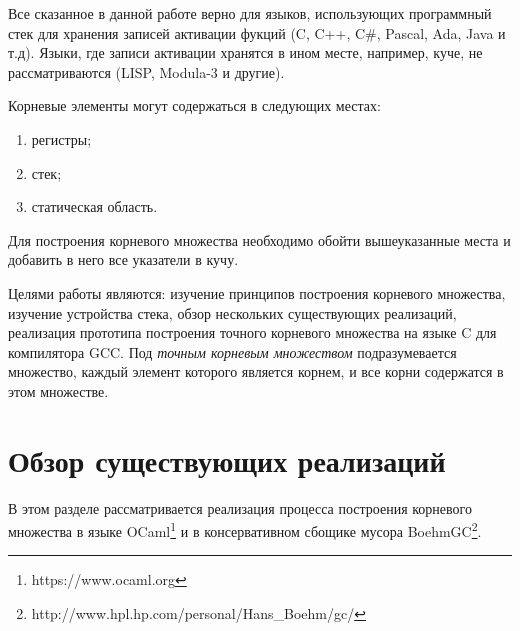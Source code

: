 \documentclass{matmex-diploma}
\begin{document}
Все сказанное в данной работе верно для языков, использующих программный стек для хранения записей активации фукций (C, C++, C\#, Pascal, Ada, Java и т.д). Языки, где записи активации хранятся в ином месте, например, куче, не рассматриваются (LISP, Modula-3 и другие).

Корневые элементы могут содержаться в следующих местах:
\begin{enumerate}
\item регистры;
\item стек;
\item статическая область.
\end{enumerate}

Для построения корневого множества необходимо обойти вышеуказанные места и добавить в него все указатели в кучу.

Целями работы являются: изучение принципов построения корневого множества, изучение устройства стека, обзор нескольких существующих реализаций, реализация прототипа построения точного корневого множества на языке C для компилятора GCC. Под \textit{точным корневым множеством} подразумевается множество, каждый элемент которого является корнем, и все корни содержатся в этом множестве.

\section{Обзор существующих реализаций}
В этом разделе рассматривается реализация процесса построения корневого множества в языке OCaml\footnote{https://www.ocaml.org} и в консервативном сбощике мусора BoehmGC\footnote{http://www.hpl.hp.com/personal/Hans_Boehm/gc/}.
\end{document}
